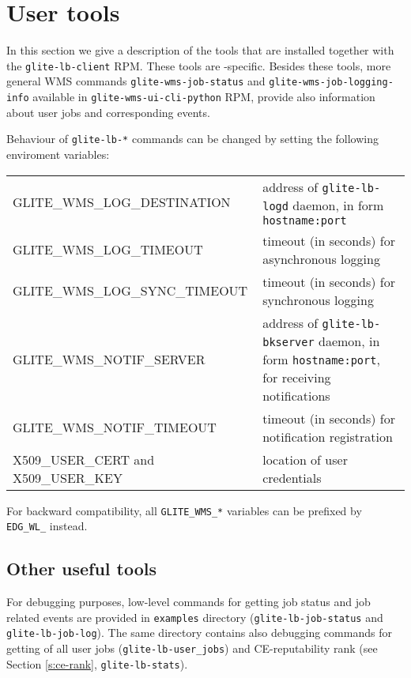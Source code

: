 \section{User tools}
\label{s:lb-tools}


In this section we give a description of the tools that are installed
together with the \verb'glite-lb-client' RPM. These tools are \LB-specific.
Besides these tools, more general WMS commands \verb'glite-wms-job-status' 
and \verb'glite-wms-job-logging-info' available 
in \verb'glite-wms-ui-cli-python' RPM, provide also information about user jobs 
and corresponding events.

Behaviour of \verb'glite-lb-*' commands can be changed by setting the following enviroment variables:
\begin{tabularx}{\textwidth}{lX}
GLITE\_WMS\_LOG\_DESTINATION & address of \verb'glite-lb-logd' daemon, in form \verb'hostname:port'\\
GLITE\_WMS\_LOG\_TIMEOUT & timeout (in seconds) for asynchronous logging\\
GLITE\_WMS\_LOG\_SYNC\_TIMEOUT & timeout (in seconds) for synchronous logging\\
GLITE\_WMS\_NOTIF\_SERVER& address of \verb'glite-lb-bkserver' daemon, in form \verb'hostname:port', for receiving notifications\\
GLITE\_WMS\_NOTIF\_TIMEOUT& timeout (in seconds) for notification registration\\
X509\_USER\_CERT and X509\_USER\_KEY & location of user credentials\\
\end{tabularx}
For backward compatibility, all \verb'GLITE_WMS_*' variables can be prefixed by 
\verb'EDG_WL_' instead.





\subsection{Other useful tools}
\label{glite-lb-other}

For debugging purposes, low-level commands for getting \LB job status and job related events are provided in 
\verb'examples' directory (\verb'glite-lb-job-status' and \verb'glite-lb-job-log'). The same directory
contains also debugging commands for getting of all user jobs (\verb'glite-lb-user_jobs') and
CE-reputability rank (see Section \ref{s:ce-rank}, \verb'glite-lb-stats').
